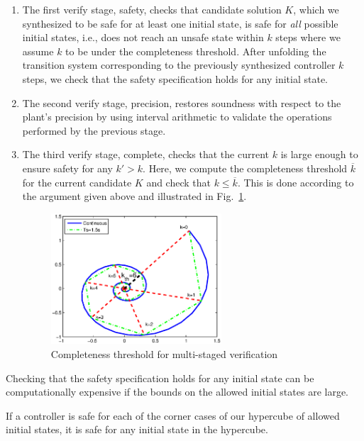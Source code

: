 \documentclass[runningheads,a4paper]{llncs}
\begin{document}
\begin{enumerate}
\item The first {\sc verify} stage, {\sc safety}, checks that candidate
solution $K$, which we synthesized to be safe for at least one initial
state, is safe for \emph{all} possible initial states, i.e., does not reach
an unsafe state within $k$ steps where we assume $k$ to be under the
completeness threshold.  After unfolding the transition system corresponding
to the previously synthesized controller $k$ steps, we check that the safety
specification holds for any initial state.

\item The second {\sc verify} stage, {\sc precision}, 
 restores soundness with respect to the plant's precision
by using interval arithmetic \cite{moore1966interval} to validate the 
operations performed by the previous stage. 

\item The third {\sc verify} stage, {\sc complete}, checks that the current
$k$ is large enough to ensure safety for any $k'{>}k$.  Here, we compute the
completeness threshold $\overline{k}$ for the current candidate $K$ and
check that $k{\leq}\overline{k}$.  This is done according to the argument
given above and illustrated in Fig.~\ref{fig:ct}.


\begin{figure}[t]
\centering
\includegraphics[width=0.6\textwidth]{ct.eps}
\vspace{0.1cm}
\caption{Completeness threshold for multi-staged verification}
\label{fig:ct}
\end{figure}

\end{enumerate}


Checking that the safety specification holds for any initial state can be 
computationally expensive if the bounds on the
allowed initial states are large. 

\begin{lemma} 
If a controller is safe for each of the corner cases of our hypercube of
allowed initial states, it is safe for any initial state in the
hypercube. 
\end{lemma}
\end{document}
